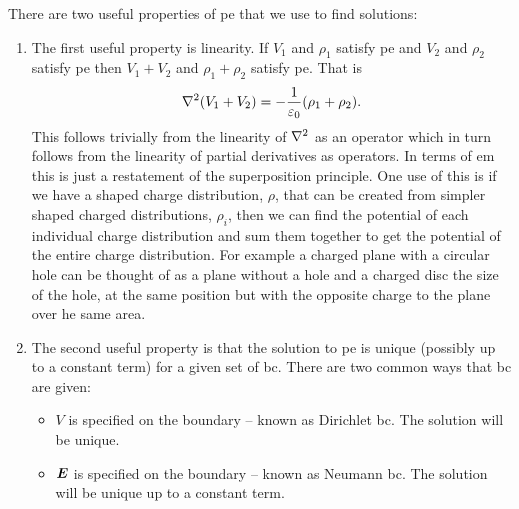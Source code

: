     There are two useful properties of \acrshort{pe} that we use to find solutions:
    \begin{enumerate}
        \item The first useful property is linearity.
        If \(V_1\) and \(\rho_1\) satisfy \acrshort{pe} and \(V_2\) and \(\rho_2\) satisfy \acrshort{pe} then \(V_1 + V_2\) and \(\rho_1 + \rho_2\) satisfy \acrshort{pe}.
        That is
        \[\nabla^2(V_1 + V_2) = -\frac{1}{\varepsilon_0}(\rho_1 + \rho_2).\]
        This follows trivially from the linearity of \(\nabla^2\) as an operator which in turn follows from the linearity of partial derivatives as operators.
        In terms of \acrshort{em} this is just a restatement of the superposition principle.
        One use of this is if we have a shaped charge distribution, \(\rho\), that can be created from simpler shaped charged distributions, \(\rho_i\), then we can find the potential of each individual charge distribution and sum them together to get the potential of the entire charge distribution.
        For example a charged plane with a circular hole can be thought of as a plane without a hole and a charged disc the size of the hole, at the same position but with the opposite charge to the plane over he same area.
        
        \item The second useful property is that the solution to \acrshort{pe} is unique (possibly up to a constant term) for a given set of \acrshort{bc}.
        There are two common ways that \acrshort{bc} are given:
        \begin{itemize}
            \item \(V\) is specified on the boundary -- known as Dirichlet \acrshort{bc}.
            The solution will be unique.
            \item \(\bm{E}\) is specified on the boundary -- known as Neumann \acrshort{bc}.
            The solution will be unique up to a constant term.
        \end{itemize}
    \end{enumerate}
    
